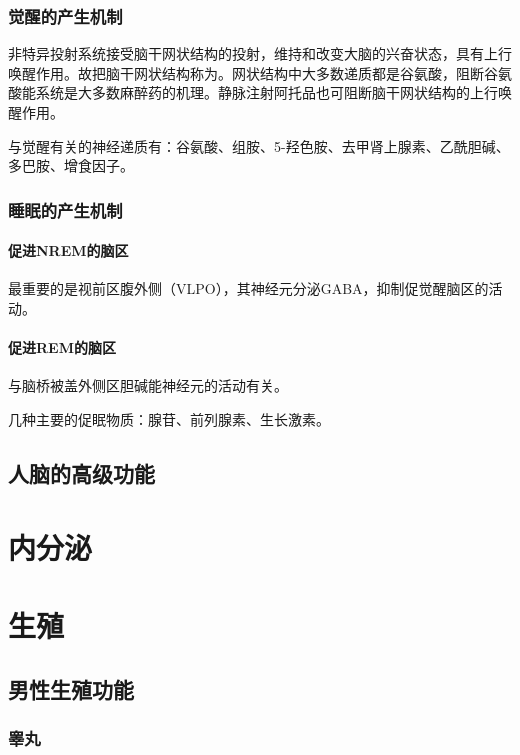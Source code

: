 \subsubsection{觉醒的产生机制}

非特异投射系统接受脑干网状结构的投射，维持和改变大脑的兴奋状态，具有上行唤醒作用。故把脑干网状结构称为。网状结构中大多数递质都是谷氨酸，阻断谷氨酸能系统是大多数麻醉药的机理。静脉注射阿托品也可阻断脑干网状结构的上行唤醒作用。

与觉醒有关的神经递质有：谷氨酸、组胺、5-羟色胺、去甲肾上腺素、乙酰胆碱、多巴胺、增食因子。

\subsubsection{睡眠的产生机制}

\paragraph{促进NREM的脑区}

最重要的是视前区腹外侧（VLPO），其神经元分泌GABA，抑制促觉醒脑区的活动。

\paragraph{促进REM的脑区}

与脑桥被盖外侧区胆碱能神经元的活动有关。

几种主要的促眠物质：腺苷、前列腺素、生长激素。

\subsection{人脑的高级功能}

\section{内分泌}


\section{生殖}

\subsection{男性生殖功能}

\subsubsection{睾丸}

